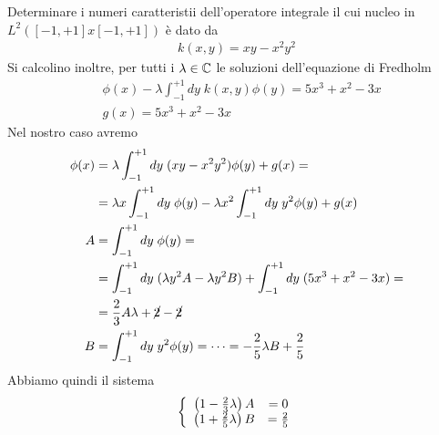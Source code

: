 Determinare i numeri caratteristii dell'operatore integrale il cui nucleo in $L^2([-1,+1]x[-1,+1])$ è dato da
\begin{align}
	k(x,y) = xy -x^2y^2
\end{align}
Si calcolino inoltre, per tutti i $\lambda\in\mathbb{C}$ le soluzioni dell'equazione di Fredholm
\begin{align}
	&\phi(x) -\lambda \int_{-1}^{+1} dy \; k(x,y) \phi(y) = 5x^3 + x^2 - 3x\\
	&g(x) = 5x^3 + x^2 - 3x
\end{align}
Nel nostro caso avremo
\begin{align}
	\phi(x) &=\lambda \int_{-1}^{+1} dy \; (xy -x^2y^2) \phi(y)  + g(x)	= \nonumber\\
	&=\lambda x \int_{-1}^{+1} dy \; \phi(y)  - \lambda x^2\int_{-1}^{+1} dy \; y^2 \phi(y) + g(x)\\
	A &= \int_{-1}^{+1} dy \; \phi(y) = \\ 
	  &=\int_{-1}^{+1} dy \; (\lambda y^2 A -\lambda y^2 B) + \int_{-1}^{+1} dy \; (5x^3 + x^2 - 3x) = \nonumber \\ 
	  &=\frac{2}{3} A \lambda + \cancel{2} -\cancel{2}\\
	B &= \int_{-1}^{+1} dy \; y^2 \phi(y) = \dots = -\frac{2}{5} \lambda B + \frac{2}{5}    
\end{align}
Abbiamo quindi il sistema
\begin{align}
	\left\{ \begin{array}{cc} \left( 1 - \frac{2}{3}\lambda \right) A &=0\\ \left( 1 + \frac{2}{5}\lambda \right) B &= \frac{2}{5} \end{array} \right.
\end{align}

